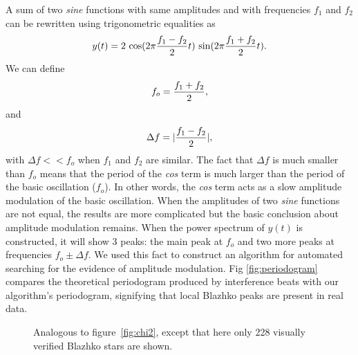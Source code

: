 A sum of two {\it sine} functions with same amplitudes and with frequencies $f_1$ and $f_2$ can be rewritten 
using trigonometric equalities as 
\begin{equation}
         y(t) = 2 \, \cos(2\pi{f_1-f_2\over 2} t) \, \sin(2\pi {f_1+f_2\over 2} t).
\end{equation} 
We can define 
\begin{equation}
\label{eq:fo}
         f_o = {f_1+f_2\over 2},
\end{equation} 
and 
\begin{equation}
\label{eq:Df}
         \Delta f = |{f_1-f_2\over 2}|,
\end{equation} 
with $\Delta f << f_o$ when $f_1$ and $f_2$ are similar. The fact that $\Delta f$ is much smaller than $f_o$ means
that the period of the {\it cos} term
is much larger than the period of the basic oscillation ($f_o$). In other words, the {\it cos} term acts as a slow
amplitude modulation of the basic oscillation. When the amplitudes of two {\it sine} functions are not equal, the
results are more complicated but the basic conclusion about amplitude modulation remains.
When the power spectrum of $y(t)$ is constructed, it will show 3 peaks: the main peak at $f_o$ and
two more peaks at frequencies $f_o \pm \Delta f$. We used this fact to construct an algorithm for
automated searching for the evidence of amplitude  modulation. 
Fig \ref{fig:periodogram} compares the theoretical periodogram produced by interference beats with our algorithm's periodogram,
signifying that local Blazhko peaks are present in real data.

\begin{figure}[ht]
  \caption{Analogous to figure~\ref{fig:chi2}, except that here only
    228 visually verified Blazhko stars are shown.}
  \label{fig:chi_final}
  \end{figure}

